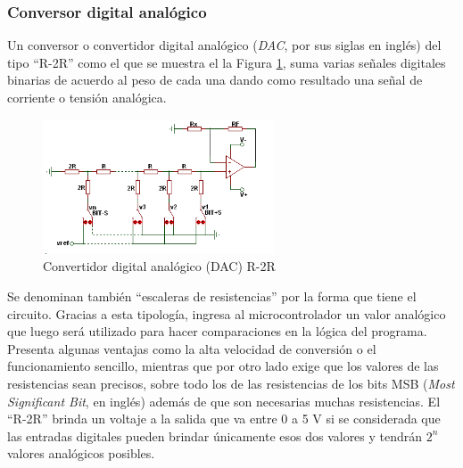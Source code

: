 ﻿\documentclass[a4paper]{article}
\begin{document}

\subsubsection*{Conversor digital analógico}

Un conversor o convertidor digital analógico (\textit{DAC}, por sus 
siglas en inglés) del tipo ``R-2R'' como el que se muestra el la 
Figura \ref{fig:conversor}, suma varias señales digitales binarias 
de acuerdo al peso de cada una dando como resultado una señal de 
corriente o tensión analógica.

\begin{figure}[h]\centering
    \includegraphics[height=4cm]{conversor.png}
    \caption{Convertidor digital analógico (DAC) R-2R}
    \label{fig:conversor}
\end{figure}

Se denominan también ``escaleras de resistencias'' por la forma que 
tiene el circuito. Gracias a esta tipología, ingresa al 
microcontrolador un valor analógico que luego será utilizado para hacer 
comparaciones en la lógica del programa. Presenta algunas 
ventajas como la alta velocidad de conversión o el funcionamiento 
sencillo, mientras que por otro lado exige que los valores de las 
resistencias sean precisos, sobre todo los de las resistencias de los
bits MSB (\textit{Most Significant Bit}, en inglés) además de que 
son necesarias muchas resistencias. El ``R-2R'' brinda un voltaje a 
la salida que va entre 0 a 5 V si se considerada que las entradas 
digitales pueden brindar únicamente esos dos valores y tendrán $2^n$ 
valores analógicos posibles.

\end{document}
